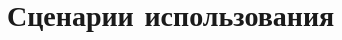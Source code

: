 \documentclass{book}
\begin{document}
\tableofcontents 	

\newpage
\chapter{Сценарии использования}

\end{document}
